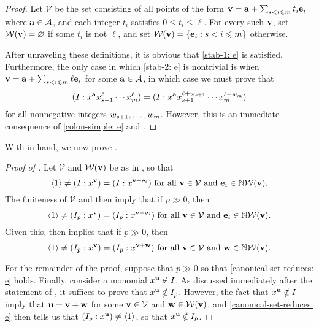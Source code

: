 \documentclass[11pt]{amsart}
\begin{document}
\begin{proof}
Let $\mathcal{V}$ be the set consisting of all points of the form $\mathbf{v} = \mathbf{a} + \sum_{s <i \leqslant m} t_i \mathbf{e}_i$ where $\mathbf{a} \in \mathcal{A}$, and each integer $t_i$ satisfies $0 \leq t_i \leq \ell$.  For every such $\mathbf{v}$, set $\mathcal{W}(\mathbf{v}) = \varnothing$ if some $t_i$ is not $\ell$, and set $\mathcal{W}(\mathbf{v}) = \{ \mathbf{e}_i : s < i \leqslant m \}$ otherwise.

After unraveling these definitions, it is obvious that \eqref{stab-1: e} is satisfied.  Furthermore, the only case in which \eqref{stab-2: e} is nontrivial is when $\mathbf{v} = \mathbf{a} + \sum_{s <i \leqslant m} \ell \mathbf{e}_i$ for some $\mathbf{a} \in \mathcal{A}$,  in which case we must prove that
%
\[( I : x^{\mathbf{a}} x_{s+1}^\ell \cdots x_m^\ell ) =   ( I : x^{\mathbf{a}} x_{s+1}^{\ell+w_{s+1}} \cdots x_{m}^{\ell+w_m}) \]
for all nonnegative integers $w_{s+1}, \ldots, w_{m}$.  However, this is an immediate consequence of \eqref{colon-simple: e} and .
\end{proof}

With  in hand, we now prove .

\begin{proof}[Proof of ] Let $\mathcal{V}$ and $\mathcal{W}(\mathbf{v})$ be as in , so that \[ \langle 1 \rangle \neq (I : x^{\mathbf{v}}) = (I : x^{\mathbf{v}+\mathbf{e}_i}) \text{ for all } \mathbf{v} \in \mathcal{V} \text{ and } \mathbf{e}_i \in \mathbb{N} \mathcal{W}(\mathbf{v}).\]
The finiteness of $\mathcal{V}$ and  then imply that if $p \gg 0$, then
\[ \langle 1 \rangle \neq (I_p : x^{\mathbf{v}}) = (I_p : x^{\mathbf{v}+\mathbf{e}_i}) \text{ for all } \mathbf{v} \in \mathcal{V} \text{ and } \mathbf{e}_i \in \mathbb{N} \mathcal{W}(\mathbf{v}).\]
Given this,  then implies that if $p \gg 0$, then
\begin{equation}
\label{canonical-set-reduces: e}
\langle 1 \rangle \neq (I_p : x^{\mathbf{v}}) = (I_p : x^{\mathbf{v}+\mathbf{w}}) \text{ for all } \mathbf{v} \in \mathcal{V} \text{ and } \mathbf{w} \in \mathbb{N} \mathcal{W}(\mathbf{v}).
\end{equation}

For the remainder of the proof, suppose that $p \gg 0$ so that \eqref{canonical-set-reduces: e} holds.  Finally, consider a monomial $x^{\mathbf{u}} \notin I$.  As discussed immediately after the statement of , it suffices to prove that $x^{\mathbf{u}} \notin I_p$.  However,   the fact that $x^{\mathbf{u}} \notin I$ imply that $\mathbf{u} = \mathbf{v} + \mathbf{w}$ for some $\mathbf{v} \in \mathcal{V}$ and $\mathbf{w} \in \mathcal{W}(\mathbf{v})$, and \eqref{canonical-set-reduces: e} then tells us that $(I_p:x^{\mathbf{u}}) \neq \langle 1 \rangle$, so that $x^{\mathbf{u}} \notin I_p$.
\end{proof}
\end{document}
